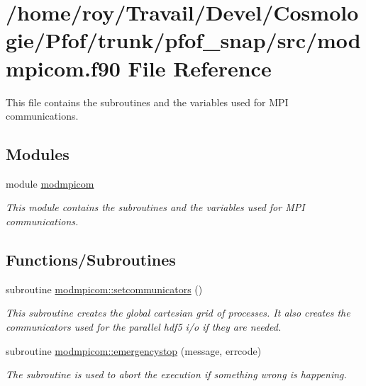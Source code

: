\hypertarget{pfof__snap_2src_2modmpicom_8f90}{}\section{/home/roy/\+Travail/\+Devel/\+Cosmologie/\+Pfof/trunk/pfof\+\_\+snap/src/modmpicom.f90 File Reference}
\label{pfof__snap_2src_2modmpicom_8f90}


This file contains the subroutines and the variables used for M\+PI communications.  


\subsection*{Modules}
\begin{DoxyCompactItemize}
\item 
module \hyperlink{namespacemodmpicom}{modmpicom}
\begin{DoxyCompactList}\small\item\em This module contains the subroutines and the variables used for M\+PI communications. \end{DoxyCompactList}\end{DoxyCompactItemize}
\subsection*{Functions/\+Subroutines}
\begin{DoxyCompactItemize}
\item 
subroutine \hyperlink{namespacemodmpicom_a95ff384e42736ca3e2ccef78d7d8554a}{modmpicom\+::setcommunicators} ()
\begin{DoxyCompactList}\small\item\em This subroutine creates the global cartesian grid of processes. It also creates the communicators used for the parallel hdf5 i/o if they are needed. \end{DoxyCompactList}\item 
subroutine \hyperlink{namespacemodmpicom_a75a2de7a16fce78b94bd79731a2fbd81}{modmpicom\+::emergencystop} (message, errcode)
\begin{DoxyCompactList}\small\item\em The subroutine is used to abort the execution if something wrong is happening. \end{DoxyCompactList}\end{DoxyCompactItemize}
